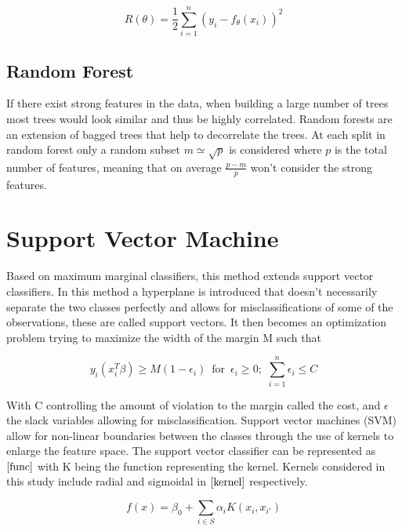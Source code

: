 \documentclass[12pt]{report}
\begin{document}
\begin{equation} \label{XGBT}
    R(\theta) = \frac{1}{2}\sum^{n}_{i=1} (y_{i} - {f}_{\theta}(x_{i}))^{2} 
\end{equation}

\subsection{Random Forest}
If there exist strong features in the data, when building a large number of trees most trees would look similar and thus be highly correlated. Random forests are an extension of bagged trees that help to decorrelate the trees. At each split in random forest only a random subset $m \simeq \sqrt{p}$ is considered where $p$ is the total number of features, meaning that on average $\frac{p-m}{p}$ won't consider the strong features.

\section{Support Vector Machine}
Based on maximum marginal classifiers, this method extends support vector classifiers. In this method a hyperplane is introduced that doesn't necessarily separate the two classes perfectly and allows for misclassifications of some of the observations, these are called support vectors. It then becomes an optimization problem trying to maximize the width of the margin M such that

\begin{equation}
    y_{i}(x^{T}_{i}\beta) \ge M(1-\epsilon_{i}) \phantom{0} \text{for} \phantom{0}  
    \epsilon_{i} \ge 0; \phantom{i} \sum^{n}_{i=1} \epsilon_{i} \le C
\end{equation}

With C controlling the amount of violation to the margin called the cost, and $\epsilon$ the slack variables allowing for misclassification. Support vector machines (SVM) allow for non-linear boundaries between the classes through the use of kernels to enlarge the feature space. The support vector classifier can be represented as $\eqref{func}$ with K being the function representing the kernel. Kernels considered in this study include radial and sigmoidal in $\eqref{kernel}$ respectively.

\begin{equation} \label{func}
    f(x) = \beta_{0} + \sum_{i \in \textit{S}} \alpha_{i} K(x_{i}, x_{i'}) 
\end{equation}
\end{document}
